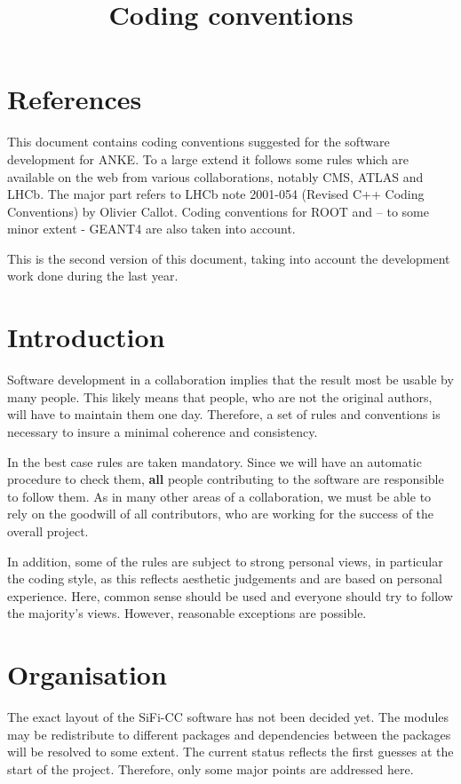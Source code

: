 \documentclass[a4paper,10pt]{article}
\title{Coding conventions}
\newcommand{\sificc}{SiFi-CC\xspace}
\begin{document}
\maketitle

\section{References}

This document contains coding conventions suggested for the
software development for ANKE. To a large extend it follows some rules
which are available on the web from various collaborations,
notably CMS, ATLAS and LHCb. The major part refers to
LHCb note 2001-054 (Revised C++ Coding Conventions) by Olivier Callot.
Coding conventions for ROOT and -- to some minor extent - GEANT4 are
also taken into account.

This is the second version of this document, taking into account the
development work done during the last year.

\section{Introduction}

Software development in a collaboration implies that the result most be
usable by many people. This likely means that people, who are not the original
authors, will have to maintain them one day. Therefore, a set of rules and
conventions is necessary to insure a minimal coherence and consistency.

In the best case rules are taken mandatory. Since we will have an automatic
procedure to check them, {\bf all} people contributing to the software are
responsible to follow them.
As in many other areas of a collaboration, we must be able to rely on
the goodwill of all contributors, who are working for the success of
the overall project.

In addition, some of the rules are subject to strong personal views,
in particular the coding style, as this reflects aesthetic judgements
and are based on personal experience. Here, common sense should be used and
everyone should try to follow the majority's views. However, reasonable
exceptions are possible.

\section{Organisation}

The exact layout of the \sificc software has not been decided yet. The
modules may be redistribute to different packages and dependencies
between the packages will be resolved to some extent. The current
status reflects the first guesses at the start of the project.
Therefore, only some major points are addressed here.
\end{document}
